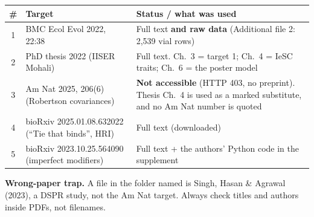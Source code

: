 \begin{tabularx}{\textwidth}{clX}\toprule
\# & Target & Status / what was used\\\midrule
1 & BMC Ecol Evol 2022, 22:38 & Full text \textbf{and raw data} (Additional file 2: 2,539 vial rows)\\
2 & PhD thesis 2022 (IISER Mohali) & Full text. Ch.\ 3 = target 1; Ch.\ 4 = IeSC traits; Ch.\ 6 = the poster model\\
3 & Am Nat 2025, 206(6) (Robertson covariances) & \textbf{Not accessible} (HTTP 403, no preprint). Thesis Ch.\ 4 is used as a marked substitute, and no Am Nat number is quoted\\
4 & bioRxiv 2025.01.08.632022 (``Tie that binds'', HRI) & Full text (downloaded)\\
5 & bioRxiv 2023.10.25.564090 (imperfect modifiers) & Full text + the authors' Python code in the supplement\\\bottomrule
\end{tabularx}

\noindent\textbf{Wrong-paper trap.} A file in the folder named  is Singh, Hasan \& Agrawal (2023), a DSPR study, not the Am Nat target. Always check titles and authors inside PDFs, not filenames.

